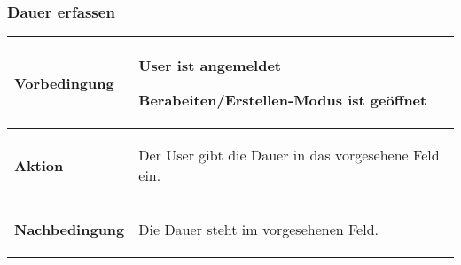 \documentclass[11pt,a4paper,titlepage,portrait,ngerman]{scrartcl}
\begin{document}
\subsubsection*{Dauer erfassen}
\vspace{2.5mm}
\noindent
\begin{tabular}{|p{}||p{}|}
\hline \rule[-2ex]{0pt}{5.5ex} \textbf{Vorbedingung} & {
	\begin{list}{\textendash}{\vspace{-5mm}}
		\item{User ist angemeldet}
		\item{Berabeiten/Erstellen-Modus ist geöffnet}
	\end{list}
} \\ 
\hline \rule[-2ex]{0pt}{5.5ex} \textbf{Aktion} & {
	\begin{list}{\textendash}{\vspace{-5mm}}
		\item{Der User gibt die Dauer in das vorgesehene Feld ein.}
	\end{list}
} \\ 
\hline \rule[-2ex]{0pt}{5.5ex} \textbf{Nachbedingung} & {
	\begin{list}{\textendash}{\vspace{-5mm}}
		\item{Die Dauer steht im vorgesehenen Feld.}
	\end{list}
}  \\
\hline 
\end{tabular}
\end{document}
